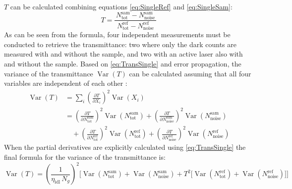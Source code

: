 $T$ can be calculated combining equations \ref{eq:SingleRef} and \ref{eq:SingleSam}:
\begin{equation}
	T = 
	\frac{\,N_{\text{tot}}^{\text{sam}} - N_{\text{noise}}^{\text{sam}}\,}
	{\,N_{\text{tot}}^{\text{ref}} - N_{\text{noise}}^{\text{ref}}\,}
	\label{eq:TransSingle}
\end{equation}
As can be seen from the formula, four independent measurements must be conducted to retrieve the transmittance: two where only the dark counts are measured with and without the sample, and two with an active laser also with and without the sample. 
\newpage
Based on \autoref{eq:TransSingle} and error propagation, the variance of the transmittance $\operatorname{Var}(T)$ can be calculated assuming that all four variables are independent of each other \cite{kuNotesUsePropagation1966}: 
\begin{equation}
	\begin{aligned}
		\operatorname{Var}(T) 
		&= \sum_{i} \left( \frac{\partial T}{\partial X_i} \right)^{2} 
		\operatorname{Var}\!\left( X_i \right) \\[0.75em]
		&= \left( \frac{\partial T}{\partial N_{\text{tot}}^{\text{sam}}} \right)^{2} 
		\operatorname{Var}\!\left( N_{\text{tot}}^{\text{sam}} \right)
		+ \left( \frac{\partial T}{\partial N_{\text{noise}}^{\text{sam}}} \right)^{2} 
		\operatorname{Var}\!\left( N_{\text{noise}}^{\text{sam}} \right) \\[0.75em]
		&\quad + \left( \frac{\partial T}{\partial N_{\text{tot}}^{\text{ref}}} \right)^{2} 
		\operatorname{Var}\!\left( N_{\text{tot}}^{\text{ref}} \right)
		+ \left( \frac{\partial T}{\partial N_{\text{noise}}^{\text{ref}}} \right)^{2} 
		\operatorname{Var}\!\left( N_{\text{noise}}^{\text{ref}} \right)
	\end{aligned}
	\label{eq:VarianceTransGen}
\end{equation}
When the partial derivatives are explicitly calculated using \autoref{eq:TransSingle} the final formula for the variance of the transmittance is:
\begin{equation}
		\operatorname{Var}(T) 
		= \left( \frac{1}{\eta_{\text{idl}}\,N_g} \right)^{2}
		\Bigg[
		\operatorname{Var}\!\left(N_{\text{tot}}^{\text{sam}}\right) 
		+ \operatorname{Var}\!\left(N_{\text{noise}}^{\text{sam}}\right) 
		+ T^{2} \Big[ 
		\operatorname{Var}\!\left(N_{\text{tot}}^{\text{ref}}\right) 
		+ \operatorname{Var}\!\left(N_{\text{noise}}^{\text{ref}}\right) 
		\Big]
		\Bigg]
	\label{eq:VarianceTransExpl}
\end{equation}
